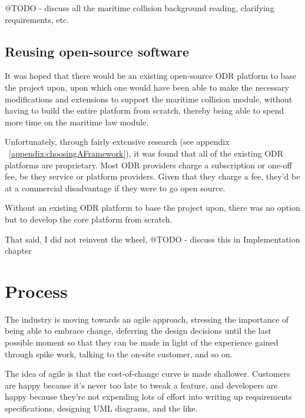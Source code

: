 @TODO - discuss all the maritime collision background reading, clarifying requirements, etc.

\subsection{Reusing open-source software}

It was hoped that there would be an existing open-source ODR platform to base the project upon, upon which one would have been able to make the necessary modifications and extensions to support the maritime collision module, without having to build the entire platform from scratch, thereby being able to spend more time on the maritime law module.

Unfortunately, through fairly extensive research (see appendix ~\ref{appendix:choosingAFramework}), it was found that all of the existing ODR platforms are proprietary. Most ODR providers charge a subscription or one-off fee, be they service or platform providers. Given that they charge a fee, they'd be at a commercial disadvantage if they were to go open source.

Without an existing ODR platform to base the project upon, there was no option but to develop the core platform from scratch.

That said, I did not reinvent the wheel, @TODO - discuss this in Implementation chapter

\section{Process} %

The industry is moving towards an agile approach, stressing the importance of being able to embrace change, deferring the design decisions until the last possible moment so that they can be made in light of the experience gained through spike work, talking to the on-site customer, and so on.

The idea of agile is that the cost-of-change curve is made shallower. Customers are happy because it's never too late to tweak a feature, and developers are happy because they're not expending lots of effort into writing up requirements specifications, designing UML diagrams, and the like.

